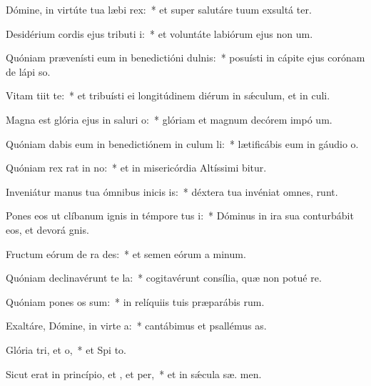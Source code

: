 \item Dómine, in virtúte tua læbi rex:~* et super salutáre tuum exsultá ter.
\item Desidérium cordis ejus tributi i:~* et voluntáte labiórum ejus non  um.
\item Quóniam prævenísti eum in benedictióni dulnis:~* posuísti in cápite ejus corónam de lápi so.
\item Vitam tiit  te:~* et tribuísti ei longitúdinem diérum in sǽculum, et in  culi.
\item Magna est glória ejus in saluri o:~* glóriam et magnum decórem impó  um.
\item Quóniam dabis eum in benedictiónem in culum li:~* lætificábis eum in gáudio   o.
\item Quóniam rex rat in no:~* et in misericórdia Altíssimi  bitur.
\item Inveniátur manus tua ómnibus inicis is:~* déxtera tua invéniat omnes,   runt.
\item Pones eos ut clíbanum ignis in témpore tus i:~* Dóminus in ira sua conturbábit eos, et devorá  gnis.
\item Fructum eórum de ra des:~* et semen eórum a  minum.
\item Quóniam declinavérunt  te la:~* cogitavérunt consília, quæ non potué re.
\item Quóniam pones os sum:~* in relíquiis tuis præparábis  rum.
\item Exaltáre, Dómine, in virte a:~* cantábimus et psallémus  as.
\item Glória tri, et o,~* et Spi to.
\item Sicut erat in princípio, et , et per,~* et in sǽcula sæ. men.
